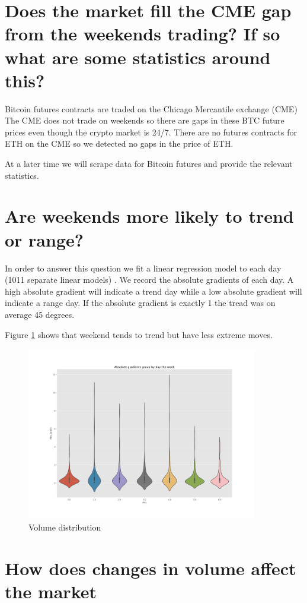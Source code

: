 \section{ Does the market fill the CME gap from the weekends trading? If so what are some statistics around this?}
Bitcoin futures contracts are traded on the Chicago Mercantile exchange (CME) The CME does not trade on weekends so there are gaps in these BTC future prices even though the crypto market is 24/7.  There are no futures contracts for ETH on the CME so we detected no gaps in the price of ETH.

At a later time we will scrape data for Bitcoin futures and provide the relevant statistics.


\section{ Are weekends more likely to trend or range?}
In order to answer this question we fit a linear regression model to each day (1011 separate linear models) . We record the absolute gradients of each day. A high absolute gradient will indicate a trend day while a low absolute gradient will indicate a range day. If the absolute gradient is exactly 1 the tread was on average 45 degrees.

Figure \ref{fig:week_trend} shows that weekend tends to trend but have less extreme moves.

\begin{figure}[H]
\center
\includegraphics[width=0.9\textwidth]{fig/week_trend.png}
\caption{Volume distribution}
\label{fig:week_trend}
\end{figure}

\section{ How does changes in volume affect the market}

